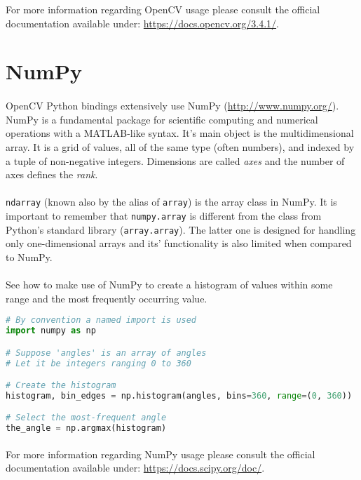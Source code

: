 For more information regarding OpenCV usage please consult the official documentation available under: \url{https://docs.opencv.org/3.4.1/}.

\section{NumPy}
\paragraph{}
OpenCV Python bindings extensively use NumPy (\url{http://www.numpy.org/}). NumPy is a fundamental package for scientific computing and numerical operations with a MATLAB-like syntax. It's main object is the multidimensional array. It is a grid of values, all of the same type (often numbers), and indexed by a tuple of non-negative integers. Dimensions are called \textit{axes} and the number of axes defines the \textit{rank}.
\paragraph{}
\texttt{ndarray} (known also by the alias of \texttt{array}) is the array class in NumPy. It is important to remember that \texttt{numpy.array} is different from the class from Python's standard library (\texttt{array.array}). The latter one is designed for handling only one-dimensional arrays and its' functionality is also limited when compared to NumPy.

\paragraph{}
See how to make use of NumPy to create a histogram of values within some range and the most frequently occurring value.

\begin{lstlisting}[language=Python, caption=Example usage of NumPy, basicstyle={\ttfamily}]
# By convention a named import is used
import numpy as np

# Suppose 'angles' is an array of angles
# Let it be integers ranging 0 to 360

# Create the histogram
histogram, bin_edges = np.histogram(angles, bins=360, range=(0, 360))

# Select the most-frequent angle
the_angle = np.argmax(histogram)
\end{lstlisting}

\paragraph{}
For more information regarding NumPy usage please consult the official documentation available under: \url{https://docs.scipy.org/doc/}.

